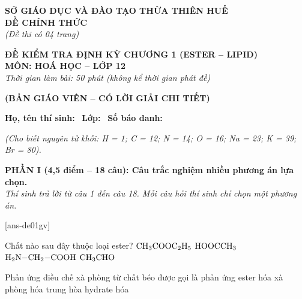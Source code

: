 \documentclass[12pt,a4paper]{article}
\begin{document}
\thispagestyle{firstpage}

\noindent
\begin{minipage}[t]{0.44\textwidth}
	\centering\fontsize{10pt}{12pt}\selectfont
	\textbf{SỞ GIÁO DỤC VÀ ĐÀO TẠO THỪA THIÊN HUẾ}\\
	\textbf{ĐỀ CHÍNH THỨC}\\
	\textit{(Đề thi có 04 trang)}
\end{minipage}\hfill
\begin{minipage}[t]{0.54\textwidth}
	\centering\small
	\textbf{ĐỀ KIỂM TRA ĐỊNH KỲ CHƯƠNG 1 (ESTER -- LIPID)}\\
	\textbf{MÔN: HOÁ HỌC -- LỚP 12}\\
	\textit{Thời gian làm bài: 50 phút (không kể thời gian phát đề)}\\
\end{minipage}

\smallskip
\begin{center}
	{\color{hfRed}\textbf{\large (BẢN GIÁO VIÊN -- CÓ LỜI GIẢI CHI TIẾT)}}
\end{center}

\smallskip
\noindent\hrulefill
\smallskip

\noindent\textbf{Họ, tên thí sinh:} \dotfill\ \textbf{Lớp:} \dotfill\ \textbf{Số báo danh:} \dotfill

\smallskip
\noindent\textit{(Cho biết nguyên tử khối: H = 1; C = 12; N = 14; O = 16; Na = 23; K = 39; Br = 80).}
\smallskip

\noindent
\textbf{PHẦN I (4,5 điểm -- 18 câu): Câu trắc nghiệm nhiều phương án lựa chọn.}\\
\textit{Thí sinh trả lời từ câu 1 đến câu 18. Mỗi câu hỏi thí sinh chỉ chọn một phương án.}

[ans-de01gv]

\begin{ex}
Chất nào sau đây thuộc loại ester?
\choice
{\True $\ce{CH3COOC2H5}$}
{$\ce{HOOCCH3}$}
{$\ce{H2N-CH2-COOH}$}
{$\ce{CH3CHO}$}
\end{ex}

\begin{ex}
Phản ứng điều chế xà phòng từ chất béo được gọi là phản ứng
\choice
{ester hóa}
{\True xà phòng hóa}
{trung hòa}
{hydrate hóa}
\end{ex}
\end{document}
